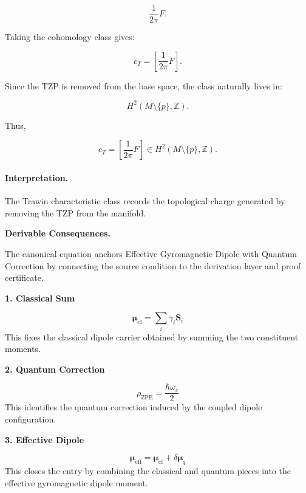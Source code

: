 \begin{equation}
\frac{1}{2\pi}F .
\end{equation}

Taking the cohomology class gives:

\begin{equation}
c_T
=
\left[
\frac{1}{2\pi}F
\right].
\end{equation}

Since the TZP is removed from the base space, the class naturally lives in:

\begin{equation}
H^2(M\setminus\{p\},\mathbb{Z}) .
\end{equation}

Thus,

\begin{equation}
\boxed{
c_T
=
\left[
\frac{1}{2\pi}F
\right]
\in
H^2(M\setminus\{p\},\mathbb{Z}) .
}
\end{equation}

\paragraph{Interpretation.}
The Trawin characteristic class records the topological charge generated by removing the TZP from the manifold.

\par\vspace{0.35em}
\noindent\textbf{Derivable Consequences.}\quad
\begingroup
\footnotesize
\raggedright
The canonical equation anchors Effective Gyromagnetic Dipole with Quantum Correction by connecting the source condition to the derivation layer and proof certificate.
\par\endgroup

\noindent\textbf{1. Classical Sum}\par
\[
\boldsymbol{\mu}_{\mathrm{cl}}=\sum_i \gamma_i\mathbf{S}_i
\]
\noindent This fixes the classical dipole carrier obtained by summing the two constituent moments.\par
\noindent\textbf{2. Quantum Correction}\par
\[
\rho_{\mathrm{ZPE}}=\frac{\hbar\omega_c}{2}
\]
\noindent This identifies the quantum correction induced by the coupled dipole configuration.\par
\noindent\textbf{3. Effective Dipole}\par
\[
\boldsymbol{\mu}_{\mathrm{eff}}=\boldsymbol{\mu}_{\mathrm{cl}}+\delta\boldsymbol{\mu}_{q}
\]
\noindent This closes the entry by combining the classical and quantum pieces into the effective gyromagnetic dipole moment.\par

